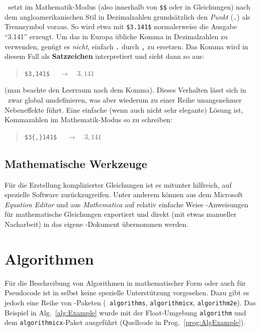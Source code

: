 \latex\ setzt im Mathematik-Modus (also innerhalb von \verb!$$! oder in Gleichungen) nach dem angloamerikanischen Stil in Dezimalzahlen grundsätzlich den \emph{Punkt} (\verb!.!) als Trennsymbol voraus. So wird etwa mit \verb!$3.141$! normalerweise die Ausgabe "`3.141"' erzeugt. Um das in Europa übliche Komma in Dezimalzahlen zu verwenden, genügt es \emph{nicht}, einfach \verb!.! durch \verb!,! zu ersetzen. Das Komma wird in diesem Fall
als \textbf{Satzzeichen} interpretiert und sieht dann so aus:
\begin{quote}
\verb!$3,141$!	$\quad \rightarrow \quad 3,141$ 
\end{quote}
(man beachte den Leerraum nach dem Komma). Dieses Verhalten lässt sich in \latex\ zwar global umdefinieren, was aber wiederum zu einer Reihe unangenehmer Nebeneffekte führt. Eine einfache (wenn auch nicht sehr elegante) Lösung ist, Kommazahlen im Mathematik-Modus so zu schreiben:
\begin{quote}
\verb!$3{,}141$!	$\quad \rightarrow \quad 3{,}141$
\end{quote}



\subsection{Mathematische Werkzeuge}

Für die Erstellung komplizierter Gleichungen ist es mitunter
hilfreich, auf spezielle Software zurückzugreifen. Unter anderem können
aus dem Microsoft \emph{Equation Editor} und aus {\em
Mathematica} auf relativ einfache Weise \latex-An\-wei\-sun\-gen
für mathematische Gleichungen exportiert und direkt (mit etwas
manueller Nacharbeit) in das eigene \latex-Dokument übernommen werden.


\section{Algorithmen}

Für die Beschreibung von Algorithmen in mathematischer Form oder auch für
Pseudo\-code ist in \latex selbst keine spezielle Unterstützung vorgesehen.
Dazu gibt es jedoch eine Reihe von \latex-Paketen (\zB\ \texttt{algorithms}, 
\texttt{algorithmicx}, \texttt{algorithm2e}).
Das Beispiel in Alg.~\ref{alg:Example} wurde mit der Float-Umgebung \texttt{algorithm} 
und dem \texttt{algorithmicx}-Paket ausgeführt
(Quellcode in Prog.~\ref{prog:AlgExample}).



